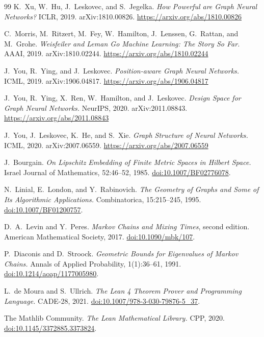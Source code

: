 \documentclass[10pt,letterpaper]{article}
\theoremstyle{definition}
\begin{document}
\begin{thebibliography}{99}
K.\ Xu, W.\ Hu, J.\ Leskovec, and S.\ Jegelka.
\emph{How Powerful are Graph Neural Networks?}
ICLR, 2019. arXiv:1810.00826.
\url{https://arxiv.org/abs/1810.00826}

C.\ Morris, M.\ Ritzert, M.\ Fey, W.\ Hamilton, J.\ Lenssen,
G.\ Rattan, and M.\ Grohe.
\emph{Weisfeiler and Leman Go Machine Learning: The Story So Far.}
AAAI, 2019. arXiv:1810.02244.
\url{https://arxiv.org/abs/1810.02244}

J.\ You, R.\ Ying, and J.\ Leskovec.
\emph{Position-aware Graph Neural Networks.}
ICML, 2019. arXiv:1906.04817.
\url{https://arxiv.org/abs/1906.04817}

J.\ You, R.\ Ying, X.\ Ren, W.\ Hamilton, and J.\ Leskovec.
\emph{Design Space for Graph Neural Networks.}
NeurIPS, 2020. arXiv:2011.08843.
\url{https://arxiv.org/abs/2011.08843}

J.\ You, J.\ Leskovec, K.\ He, and S.\ Xie.
\emph{Graph Structure of Neural Networks.}
ICML, 2020. arXiv:2007.06559.
\url{https://arxiv.org/abs/2007.06559}

J.\ Bourgain.
\emph{On Lipschitz Embedding of Finite Metric Spaces in Hilbert Space.}
Israel Journal of Mathematics, 52:46--52, 1985.
\href{https://doi.org/10.1007/BF02776078}{doi:10.1007/BF02776078}.

N.\ Linial, E.\ London, and Y.\ Rabinovich.
\emph{The Geometry of Graphs and Some of Its Algorithmic Applications.}
Combinatorica, 15:215--245, 1995.
\href{https://doi.org/10.1007/BF01200757}{doi:10.1007/BF01200757}.

D.\ A.\ Levin and Y.\ Peres.
\emph{Markov Chains and Mixing Times}, second edition.
American Mathematical Society, 2017.
\href{https://doi.org/10.1090/mbk/107}{doi:10.1090/mbk/107}.

P.\ Diaconis and D.\ Stroock.
\emph{Geometric Bounds for Eigenvalues of Markov Chains.}
Annals of Applied Probability, 1(1):36--61, 1991.
\href{https://doi.org/10.1214/aoap/1177005980}{doi:10.1214/aoap/1177005980}.

L.\ de Moura and S.\ Ullrich.
\emph{The Lean 4 Theorem Prover and Programming Language.}
CADE-28, 2021.
\href{https://doi.org/10.1007/978-3-030-79876-5_37}{doi:10.1007/978-3-030-79876-5\_37}.

The Mathlib Community.
\emph{The Lean Mathematical Library.}
CPP, 2020.
\href{https://doi.org/10.1145/3372885.3373824}{doi:10.1145/3372885.3373824}.


\end{thebibliography}
\end{document}
